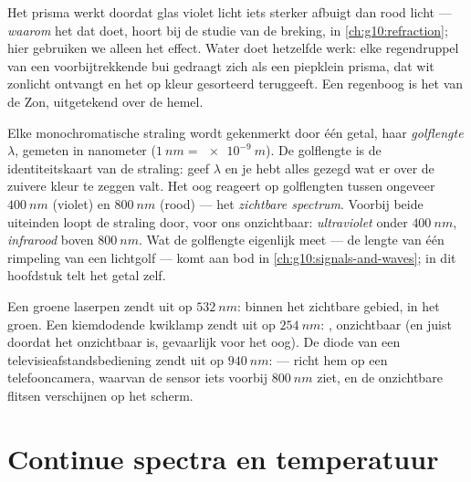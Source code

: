 \begin{remark}\label{rem:g10:light-spectra:rainbow}
Het prisma werkt doordat glas violet licht iets sterker afbuigt dan rood
licht --- \emph{waarom} het dat doet, hoort bij de studie van de breking,
in \cref{ch:g10:refraction}; hier gebruiken we alleen het effect. Water
doet hetzelfde werk: elke regendruppel van een voorbijtrekkende bui
gedraagt zich als een piepklein prisma, dat wit zonlicht ontvangt en het
op kleur gesorteerd teruggeeft. Een regenboog is het  van de Zon,
uitgetekend over de hemel.
\end{remark}

\begin{definition}\label{def:g10:light-spectra:wavelength}
Elke monochromatische straling wordt gekenmerkt door één getal, haar
\emph{golflengte} $\lambda$, gemeten in nanometer
($\qty{1}{nm} = \qty{e-9}{m}$). De golflengte is de identiteitskaart van
de straling: geef $\lambda$ en je hebt alles gezegd wat er over de
zuivere kleur te zeggen valt. Het oog reageert op golflengten tussen
ongeveer $\qty{400}{nm}$ (violet) en $\qty{800}{nm}$ (rood) --- het
\emph{zichtbare spectrum}. Voorbij beide
uiteinden loopt de straling door, voor ons onzichtbaar:
\emph{ultraviolet} onder $\qty{400}{nm}$,
\emph{infrarood} boven $\qty{800}{nm}$. Wat de
golflengte eigenlijk meet --- de lengte van één rimpeling van een
lichtgolf --- komt aan bod in \cref{ch:g10:signals-and-waves}; in dit
hoofdstuk telt het getal zelf.
\end{definition}

\begin{example}\label{ex:g10:light-spectra:classify}
Een groene laserpen zendt uit op $\qty{532}{nm}$: binnen het zichtbare
gebied, in het groen. Een kiemdodende kwiklamp zendt uit op
$\qty{254}{nm}$: , onzichtbaar (en juist doordat het
onzichtbaar is, gevaarlijk voor het oog). De diode van een
televisieafstandsbediening zendt uit op $\qty{940}{nm}$:  ---
richt hem op een telefooncamera, waarvan de sensor iets voorbij
$\qty{800}{nm}$ ziet, en de onzichtbare flitsen verschijnen op het
scherm.
\end{example}

\section{Continue spectra en temperatuur}


